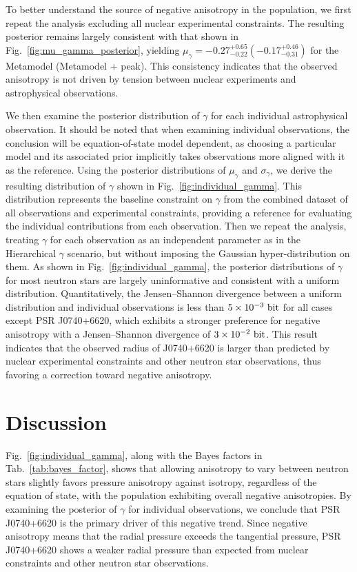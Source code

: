 \documentclass[prd,twocolumn,a4paper,floatfix,nofootinbib,preprintnumbers,superscriptaddress]{revtex4-1}
\begin{document}
To better understand the source of negative anisotropy in the population, we first repeat the analysis excluding all nuclear experimental constraints. The resulting posterior remains largely consistent with that shown in Fig.~\ref{fig:mu_gamma_posterior}, yielding $\mu_\gamma=-0.27^{+0.65}_{-0.22}(-0.17^{+0.46}_{-0.31})$ for the Metamodel (Metamodel + peak). This consistency indicates that the observed anisotropy is not driven by tension between nuclear experiments and astrophysical observations.

We then examine the posterior distribution of $\gamma$ for each individual astrophysical observation. It should be noted that when examining individual observations, the conclusion will be equation-of-state model dependent, as choosing a particular model and its associated prior implicitly takes observations more aligned with it as the reference. Using the posterior distributions of $\mu_\gamma$ and $\sigma_\gamma$, we derive the resulting distribution of $\gamma$ shown in Fig.~\ref{fig:individual_gamma}. This distribution represents the baseline constraint on $\gamma$ from the combined dataset of all observations and experimental constraints, providing a reference for evaluating the individual contributions from each observation. Then we repeat the analysis, treating $\gamma$ for each observation as an independent parameter as in the Hierarchical $\gamma$ scenario, but without imposing the Gaussian hyper-distribution on them. As shown in Fig.~\ref{fig:individual_gamma}, the posterior distributions of $\gamma$ for most neutron stars are largely uninformative and consistent with a uniform distribution. Quantitatively, the Jensen–Shannon divergence between a uniform distribution and individual observations is less than $5\times10^{-3} \ {\rm bit}$ for all cases except PSR J0740+6620, which exhibits a stronger preference for negative anisotropy with a Jensen–Shannon divergence of $3\times10^{-2} \ {\rm bit}$. This result indicates that the observed radius of J0740+6620 is larger than predicted by nuclear experimental constraints and other neutron star observations, thus favoring a correction toward negative anisotropy.

\section{Discussion}
\label{sec:discussion}
Fig.~\ref{fig:individual_gamma}, along with the Bayes factors in Tab.~\ref{tab:bayes_factor}, shows that allowing anisotropy to vary between neutron stars slightly favors pressure anisotropy against isotropy, regardless of the equation of state, with the population exhibiting overall negative anisotropies. By examining the posterior of $\gamma$ for individual observations, we conclude that PSR J0740+6620 is the primary driver of this negative trend. Since negative anisotropy means that the radial pressure exceeds the tangential pressure, PSR J0740+6620 shows a weaker radial pressure than expected from nuclear constraints and other neutron star observations.
\end{document}
